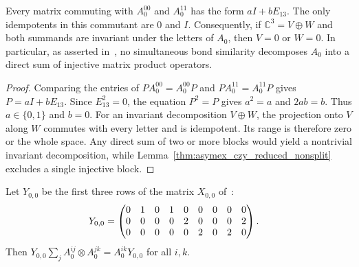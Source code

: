 \begin{lemma}
    \label{thm:asymex_czy_reduced_indecomposable}
    \leanok
    Every matrix commuting with $A_0^{00}$ and $A_0^{11}$ has the form
    $aI+bE_{13}$. The only idempotents in this commutant are $0$ and $I$.
    Consequently, if $\mathbb C^3=V\oplus W$ and both summands are invariant
    under the letters of $A_0$, then $V=0$ or $W=0$.
    In particular, as asserted in~\cite[Section~II]{Liu2025Bialgebraic},
    no simultaneous bond similarity decomposes $A_0$ into a direct sum of
    injective matrix product operators.
\end{lemma}

\begin{proof}
    \leanok
    Comparing the entries of $PA_0^{00}=A_0^{00}P$ and
    $PA_0^{11}=A_0^{11}P$ gives $P=aI+bE_{13}$.
    Since $E_{13}^2=0$, the equation $P^2=P$ gives $a^2=a$ and $2ab=b$.
    Thus $a\in\{0,1\}$ and $b=0$.
    For an invariant decomposition $V\oplus W$, the projection onto $V$
    along $W$ commutes with every letter and is idempotent. Its range is
    therefore zero or the whole space.
    Any direct sum of two or more blocks would yield a nontrivial
    invariant decomposition, while
    Lemma~\ref{thm:asymex_czy_reduced_nonsplit} excludes a single
    injective block.
\end{proof}

\begin{lemma}
    \label{thm:asymex_czy_fusion}
    \leanok
    Let $Y_{0,0}$ be the first three rows of the matrix $X_{0,0}$
    of~\cite[Appendix~B]{Liu2025Bialgebraic}:
    \begin{align}
        Y_{0,0} & =\begin{pmatrix}
                       0 & 1 & 0 & 1 & 0 & 0 & 0 & 0 & 0 \\
                       0 & 0 & 0 & 0 & 2 & 0 & 0 & 0 & 2 \\
                       0 & 0 & 0 & 0 & 0 & 2 & 0 & 2 & 0
                   \end{pmatrix}.
        \notag
    \end{align}
    Then $Y_{0,0}\sum_jA_0^{ij}\otimes A_0^{jk}=A_0^{ik}Y_{0,0}$ for all
    $i,k$.
\end{lemma}

